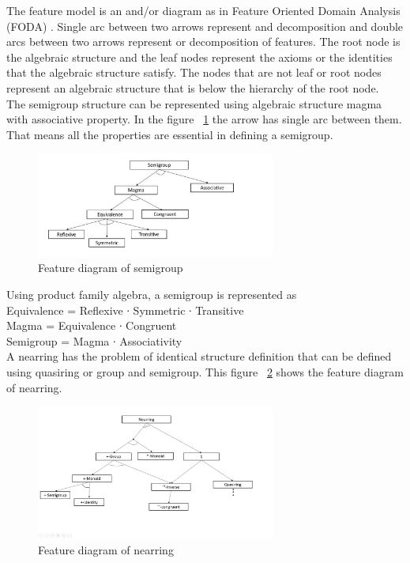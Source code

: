 The feature model is an and/or diagram as in Feature Oriented Domain Analysis (FODA) \cite{kang1990feature}. Single arc between two arrows represent and decomposition and double arcs between two arrows represent or decomposition of features. The root node is the algebraic structure and the leaf nodes represent the axioms or the identities that the algebraic structure satisfy. The nodes that are not leaf or root nodes represent an algebraic structure that is below the hierarchy of the root node. \\

The semigroup structure can be represented using algebraic structure magma with associative property. In the figure ~\ref{fig_multienv_1} the arrow has single arc between them. That means all the properties are essential in defining a semigroup.
\begin{figure}[ht]
	\centering
	\includegraphics[width=0.7\textwidth]{figures/Sample/semigroupPFA.jpg}
	\caption{Feature diagram of semigroup}
	\label{fig_multienv_1}
\end{figure}

Using product family algebra, a semigroup is represented as \\
Equivalence = Reflexive ∙ Symmetric ∙ Transitive\\
Magma = Equivalence ∙ Congruent\\
Semigroup = Magma ∙ Associativity \\

A nearring has the problem of identical structure definition that can be defined using quasiring or group and semigroup. This figure ~\ref{fig_nearring} shows the feature diagram of nearring. 
 \begin{figure}[ht]
	\centering		
	\includegraphics[width=0.7\textwidth]{figures/Sample/nearringPFA.jpg}
	\caption{Feature diagram of nearring}
	\label{fig_nearring}
\end{figure}

